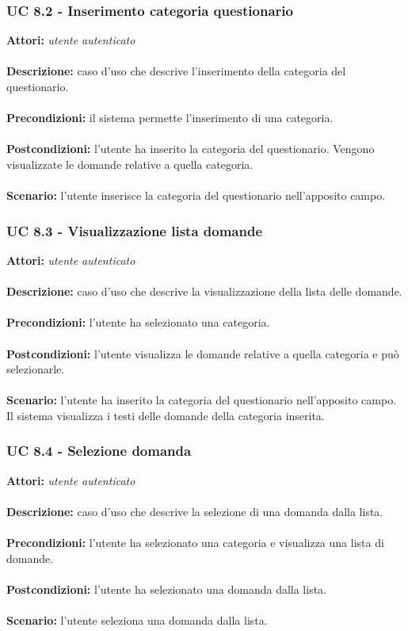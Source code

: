 \documentclass[a4paper,11pt]{article}
\begin{document}
\subsubsection{UC 8.2 - Inserimento categoria questionario}

\textbf{Attori:} \textit{utente autenticato}
\\ \\
\textbf{Descrizione:} caso d'uso che descrive l'inserimento della categoria del questionario.\\
\\
\textbf{Precondizioni:} il sistema permette l'inserimento di una categoria.\\
\\
\textbf{Postcondizioni:} l’utente ha inserito la categoria del questionario. Vengono visualizzate le domande relative a quella categoria.\\
\\
\textbf{Scenario:} l’utente inserisce la categoria del questionario nell'apposito campo.\\


\subsubsection{UC 8.3 - Visualizzazione lista domande}

\textbf{Attori:} \textit{utente autenticato}
\\ \\
\textbf{Descrizione:} caso d'uso che descrive la visualizzazione della lista delle domande.\\
\\
\textbf{Precondizioni:} l'utente ha selezionato una categoria.\\
\\
\textbf{Postcondizioni:} l’utente visualizza le domande relative a quella categoria e può selezionarle.\\
\\
\textbf{Scenario:} l’utente ha inserito la categoria del questionario nell'apposito campo. Il sistema visualizza i testi delle domande della categoria inserita.\\


\subsubsection{UC 8.4 - Selezione domanda}

\textbf{Attori:} \textit{utente autenticato}
\\ \\
\textbf{Descrizione:} caso d'uso che descrive la selezione di una domanda dalla lista.\\
\\
\textbf{Precondizioni:} l'utente ha selezionato una categoria e visualizza una lista di domande.\\
\\
\textbf{Postcondizioni:} l’utente ha selezionato una domanda dalla lista.\\
\\
\textbf{Scenario:} l'utente seleziona una domanda dalla lista.\\
\end{document}
